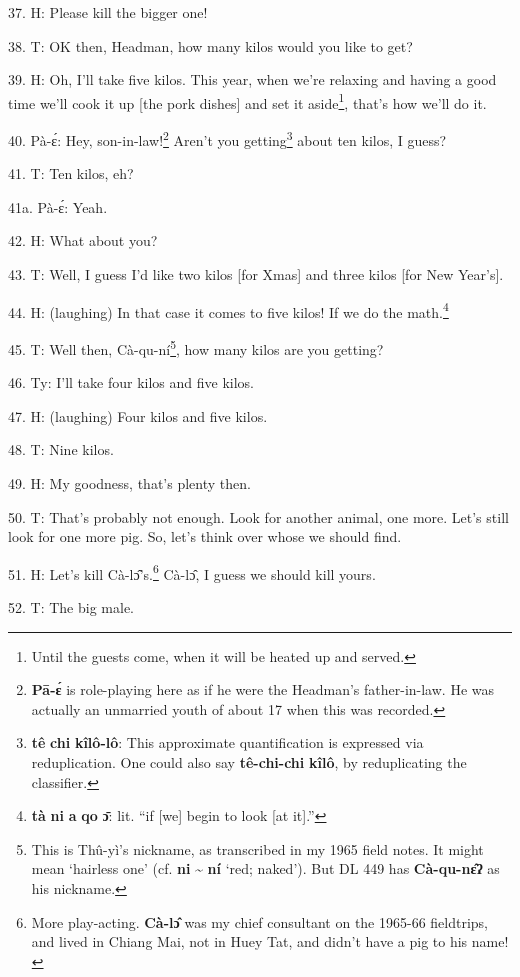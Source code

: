 37. H: Please kill the bigger one!

38. T: OK then, Headman, how many kilos would you like to get?

39. H: Oh, I'll take five kilos. This year, when we're relaxing and having a good
time we'll cook it up [the pork dishes] and set it aside\footnote{Until the guests come, when it will be heated up and served.}, that's how we'll
do it.

40. Pà-ɛ́: Hey, son-in-law!\footnote{\textbf{Pā-ɛ́} is role-playing here as if he were the Headman's father-in-law. He was actually an unmarried youth of about 17 when this was recorded.} Aren't you getting\footnote{\textbf{tê} \textbf{chi} \textbf{kîlô-lô}: This approximate quantification is expressed via reduplication. One could also say \textbf{tê-chi-chi} \textbf{kîlô}, by reduplicating the classifier.} about ten kilos, I
guess?

41. T: Ten kilos, eh?

41a. Pà-ɛ́: Yeah.

42. H: What about you?

43. T: Well, I guess I'd like two kilos [for Xmas] and three kilos [for New Year's].

44. H: (laughing) In that case it comes to five kilos! If we do the math.\footnote{\textbf{tà} \textbf{ni} \textbf{a} \textbf{qo} \textbf{ɔ̄}: lit. ``if [we] begin to look [at it].''}

45. T: Well then, Cà-qu-ní\footnote{This is Thû-yì's nickname, as transcribed in my 1965 field notes. It might mean `hairless one' (cf. \textbf{ni} \textasciitilde{ \textbf{ní}} `red; naked'). But DL 449 has \textbf{Cà-qu-nɛ̂ʔ} as his nickname.}, how many kilos are you getting?

46. Ty: I'll take four kilos and five kilos.

47. H: (laughing) Four kilos and five kilos.

48. T: Nine kilos.

49. H: My goodness, that's plenty then.

50. T: That's probably not enough. Look for another animal, one more. Let's still
look for one more pig. So, let's think over whose we should find.

51. H: Let's kill Cà-lɔ̂'s.\footnote{More play-acting. \textbf{Cà-lɔ̂} was my chief consultant on the 1965-66 fieldtrips, and lived in Chiang Mai, not in Huey Tat, and didn't have a pig to his name!} Cà-lɔ̂, I guess we should kill yours.

52. T: The big male.


